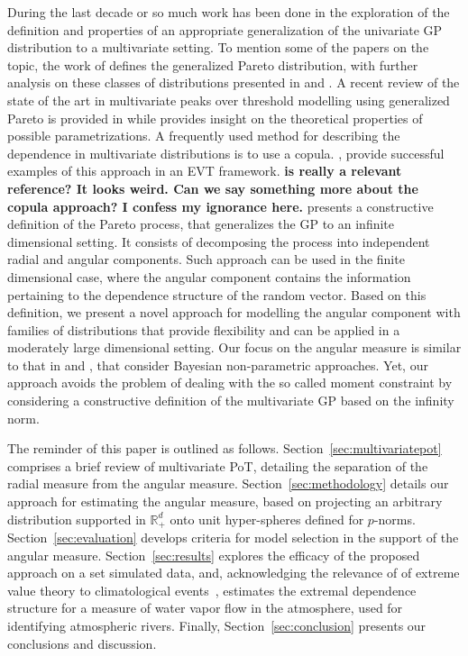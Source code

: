 During the last decade or so much work has been done in the exploration of the definition and properties of an
  appropriate generalization of the univariate GP distribution 
  to a multivariate setting.  To mention some of the papers on the topic, the work of
  \cite{rootzen2006} defines the generalized Pareto distribution, with further analysis on these classes
  of distributions presented in \cite{falk2008} and \cite{michel2008}.  A recent review of the state
  of the art in multivariate peaks over threshold modelling using generalized Pareto is provided in
  \cite{rootzen2018} while \cite{RoSeWa2018a} provides insight on the theoretical properties of possible parametrizations. 
  A frequently used method for describing the dependence
  in multivariate distributions is to use a copula. \cite{renard2007,deng2011,falk2019}, provide successful examples of this approach in an EVT framework. {\bf is \cite{deng2011} really a relevant reference? It looks weird. Can we say something more about the copula approach? I confess my ignorance here.}
  \cite{ferreira2014} presents a constructive definition of the Pareto process, that generalizes the GP to an infinite dimensional setting. It consists of decomposing the process into independent radial and angular components. Such approach can be used in the finite dimensional case, where the angular component 
  contains the information pertaining to the dependence structure of the random vector.
  Based on this definition, we present a novel approach for modelling  the angular component
  with families of distributions that provide flexibility and can be applied in a moderately large dimensional setting.
  Our focus on the  angular measure is similar to that in \cite{SaNa2014} and \cite{HaCaCh2017}, that consider Bayesian non-parametric approaches. Yet, our approach avoids the problem of dealing with the so called moment constraint by considering a constructive definition of the multivariate GP based on the infinity norm.
  
  The reminder of this paper is outlined as follows. Section~\ref{sec:multivariatepot} comprises a brief review of multivariate PoT, detailing the separation of the radial measure from the angular measure.
  Section~\ref{sec:methodology} details our approach for estimating the angular measure, based on projecting an arbitrary distribution supported in ${\mathbb R}_+^d$ onto unit hyper-spheres defined for $p$-norms. Section~\ref{sec:evaluation} develops criteria for model selection in the support of the angular measure.  Section~\ref{sec:results} explores the efficacy of the proposed approach on a set simulated data, and, acknowledging the relevance of of extreme value theory to climatological events~\citep{jentsch2007,vousdoukas2018,li2019}, estimates the extremal dependence structure for a measure of water vapor flow in the atmosphere, used for identifying atmospheric rivers.  Finally, Section~\ref{sec:conclusion} presents our conclusions and discussion.

